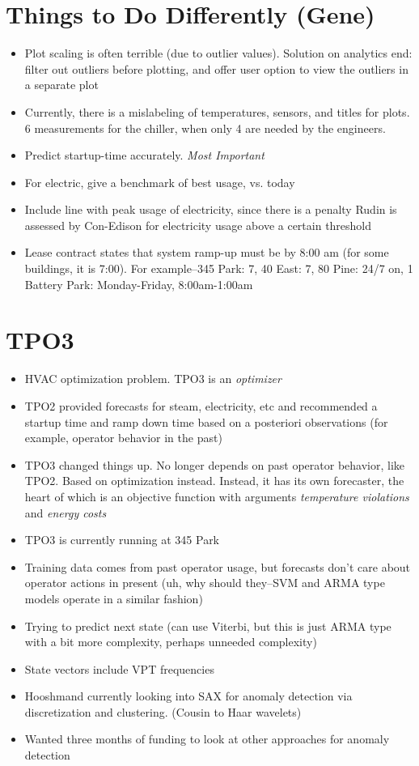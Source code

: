 \documentclass[12pt]{article}
\begin{document}
\section*{Things to Do Differently (Gene)}
\begin{itemize}
	\item Plot scaling is often terrible (due to outlier values). Solution on
		analytics end: filter out outliers before plotting, and offer user option
		to view the outliers in a separate plot
	\item Currently, there is a mislabeling of temperatures, sensors, and
		titles for plots. 6 measurements for the chiller, when only 4 are
		needed by the engineers.
	\item Predict startup-time accurately. \emph{Most Important}
	\item For electric, give a benchmark of best usage, vs. today
	\item Include line with peak usage of electricity, since there is a penalty
		Rudin is assessed by Con-Edison for electricity usage above a certain
		threshold
	\item Lease contract states that system ramp-up must be by 8:00 am (for
		some buildings, it is 7:00). For example--345 Park: 7, 40 East: 7, 80 Pine:
		24/7 on, 1 Battery Park: Monday-Friday, 8:00am-1:00am
\end{itemize}
\section*{TPO3}
\begin{itemize}
	\item HVAC optimization problem. TPO3 is an \emph{optimizer}
	\item TPO2 provided forecasts for steam, electricity, etc and recommended
		a startup time and ramp down time based on a posteriori observations (for
		example, operator behavior in the past)
	\item TPO3 changed things up. No longer depends on past operator behavior,
		like TPO2. Based on optimization instead. Instead, it has its own
		forecaster, the heart of which is an objective function with arguments
		\emph{temperature violations} and \emph{energy costs}
	\item TPO3 is currently running at 345 Park
	\item Training data comes from past operator usage, but forecasts don't
		care about operator actions in present (uh, why should they--SVM and ARMA
		type models operate in a similar fashion)
	\item Trying to predict next state (can use Viterbi, but this is just ARMA
		type with a bit more complexity, perhaps unneeded complexity)
	\item State vectors include VPT frequencies
	\item Hooshmand currently looking into SAX for anomaly detection via
		discretization and clustering. (Cousin to Haar wavelets)
	\item Wanted three months of funding to look at other approaches for
		anomaly detection
\end{itemize}
\end{document}

